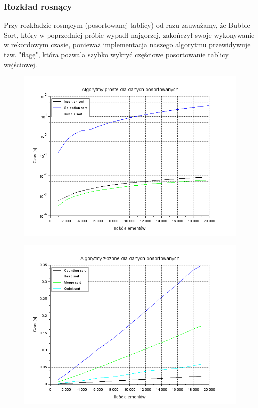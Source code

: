 \documentclass{article}
\begin{document}
\subsubsection{Rozkład rosnący}

Przy rozkładzie rosnącym (posortowanej tablicy) od razu zauważamy, że Bubble Sort, który w poprzedniej próbie wypadł najgorzej, zakończył swoje wykonywanie w rekordowym czasie, ponieważ implementacja naszego algorytmu przewidywuje tzw. "flagę", która pozwala szybko wykryć częściowe posortowanie tablicy wejściowej.

\begin{figure}[h]
\centering
\begin{minipage}{.5\textwidth}
  \centering
  \includegraphics[width=1\linewidth]{proste posortowane.png}
  \label{fig:proste_sorted}
\end{minipage}%
\begin{minipage}{.5\textwidth}
  \centering
  \includegraphics[width=1\linewidth]{zlozone posortowane.png}
  \label{fig:zlozone posortowane}
\end{minipage}
\end{figure}
\end{document}
